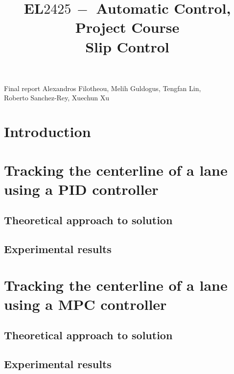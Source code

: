 \documentclass[a4paper,12pt,oneside,onecolumn]{article} %
\title{
	\vspace{1in}
  EL$2425\ -$ Automatic Control, Project Course \\
  \vspace{0.2in}
  Slip Control
}
\begin{document}
	\maketitle

  \vfill

  \begin{center}

    \large Final report
    \vfill
    Alexandros Filotheou, Melih Guldogus, Tengfan Lin,\\ Roberto Sanchez-Rey, Xuechun Xu
  \end{center}

  \newpage
  \tableofcontents
  \newpage

\section{Introduction}

  

  \section{Tracking the centerline of a lane using a PID controller}

    \subsection{Theoretical approach to solution}
      

    \subsection{Experimental results}
      


  \section{Tracking the centerline of a lane using a MPC controller}

    \subsection{Theoretical approach to solution}
      

    \subsection{Experimental results}
      
\end{document}

